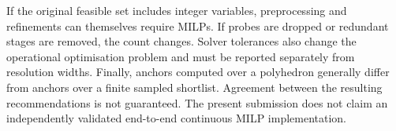 If the original feasible set includes integer variables, preprocessing and refinements can themselves require MILPs. If probes are dropped or redundant stages are removed, the count changes. Solver tolerances also change the operational optimisation problem and must be reported separately from resolution widths. Finally, anchors computed over a polyhedron generally differ from anchors over a finite sampled shortlist. Agreement between the resulting recommendations is not guaranteed. The present submission does not claim an independently validated end-to-end continuous MILP implementation.
